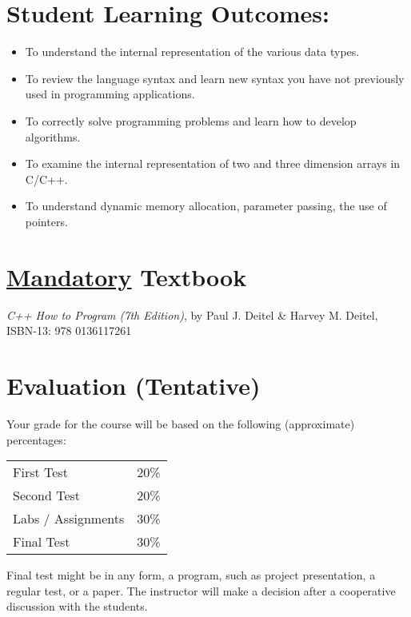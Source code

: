 \documentclass[11pt]{article}
\begin{document}
\section*{Student Learning Outcomes:}
\label{sec-4}


\begin{itemize}
\item To understand the internal representation of the various data types.
\item To review the language syntax and learn new syntax you have not previously used in programming applications.
\item To correctly solve programming problems and learn how to develop algorithms.
\item To examine the internal representation of two and three dimension arrays in C/C++.
\item To understand dynamic memory allocation, parameter passing, the use of pointers.
\end{itemize}
\section*{\underline{Mandatory} Textbook}
\label{sec-5}

\emph{C++ How to Program (7th Edition)}, by Paul J. Deitel \& Harvey M. Deitel, ISBN-13: 978 0136117261
\section*{Evaluation (Tentative)}
\label{sec-6}

Your grade for the course will be based on the following (approximate) percentages:


\begin{center}
\begin{tabular*}{0.9\textwidth}{ll}
 First Test          &  20\%  \\
 Second Test         &  20\%  \\
 Labs / Assignments  &  30\%  \\
 Final Test          &  30\%  \\
\end{tabular*}
\end{center}



Final test might be in any form, a program, such as project
presentation, a regular test, or a paper. The instructor will make a
decision after a cooperative discussion with the students.
\end{document}

